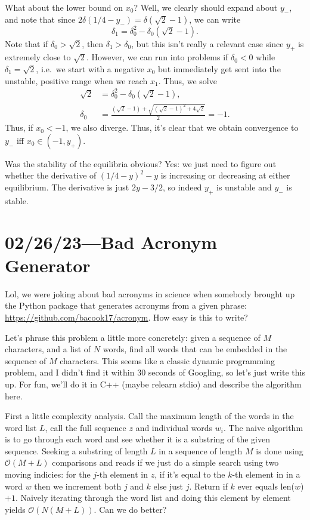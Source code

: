 \documentclass[12pt]{report}
\newcommand*{\p}[1]{\left(#1\right)}
\begin{document}
What about the lower bound on $x_0$? Well, we clearly should expand about $y_-$,
and note that since $2\delta(1/4 - y_-) = \delta(\sqrt{2} - 1)$, we can write
\begin{equation}
    \delta_1 = \delta_0^2 - \delta_0\p{\sqrt{2} - 1}.
\end{equation}
Note that if $\delta_0 > \sqrt{2}$, then $\delta_1 > \delta_0$, but this isn't
really a relevant case since $y_+$ is extremely close to $\sqrt{2}$. However, we
can run into problems if $\delta_0 < 0$ while $\delta_1 = \sqrt{2}$, i.e.\ we
start with a negative $x_0$ but immediately get sent into the unstable, positive
range when we reach $x_1$. Thus, we solve
\begin{align}
    \sqrt{2} &= \delta_0^2 - \delta_0\p{\sqrt{2} - 1},\\
    \delta_0 &= \frac{(\sqrt{2} - 1) + \sqrt{\p{\sqrt{2} - 1}^2 + 4\sqrt{2}}}{2}
        = -1.
\end{align}
Thus, if $x_0 < -1$, we also diverge. Thus, it's clear that we obtain
convergence to $y_-$ iff $x_0 \in \p{-1, y_+}$.

Was the stability of the equilibria obvious? Yes: we just need to figure out
whether the derivative of $\p{1/4 - y}^2 - y$ is increasing or decreasing at
either equilibrium. The derivative is just $2y - 3/2$, so indeed $y_+$ is
unstable and $y_-$ is stable.

\chapter{02/26/23---Bad Acronym Generator}

Lol, we were joking about bad acronyms in science when somebody brought up the
Python package that generates acronyms from a given phrase:
\url{https://github.com/bacook17/acronym}. How easy is this to write?

Let's phrase this problem a little more concretely: given a sequence of $M$
characters, and a list of $N$ words, find all words that can be embedded in the
sequence of $M$ characters. This seems like a classic dynamic programming
problem, and I didn't find it within 30 seconds of Googling, so let's just write
this up. For fun, we'll do it in C++ (maybe relearn stdio) and describe the
algorithm here.

First a little complexity analysis. Call the maximum length of the words in the
word list $L$, call the full sequence $z$ and individual words $w_i$. The naive
algorithm is to go through each word and see whether it is a substring of the
given sequence. Seeking a substring of length $L$ in a sequence of length $M$ is
done using $\mathcal{O}(M+L)$ comparisons and reads if we just do a simple
search using two moving indicies: for the $j$-th element in $z$, if it's equal
to the $k$-th element in in a word $w$ then we increment both $j$ and $k$ else
just $j$. Return if $k$ ever equals len($w$) $+1$. Naively iterating through the
word list and doing this element by element yields $\mathcal{O}\p{N(M + L)}$.
Can we do better?
\end{document}
